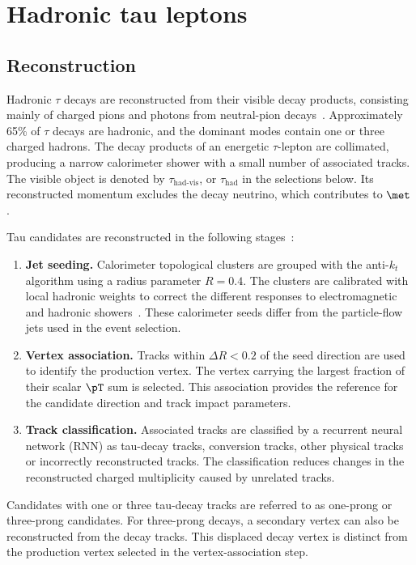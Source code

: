 \section{Hadronic tau leptons}
\label{sec:ch6_tau}

\subsection{Reconstruction}

Hadronic $\tau$ decays are reconstructed from their visible decay products, consisting mainly of charged pions and photons from neutral-pion decays~\cite{ATLAS2022TauR22}.
Approximately 65\% of $\tau$ decays are hadronic, and the dominant modes contain one or three charged hadrons.
The decay products of an energetic $\tau$-lepton are collimated, producing a narrow calorimeter shower with a small number of associated tracks.
The visible object is denoted by $\tau_{\mathrm{had\text{-}vis}}$, or $\tau_{\mathrm{had}}$ in the selections below.
Its reconstructed momentum excludes the decay neutrino, which contributes to $\met$.

Tau candidates are reconstructed in the following stages~\cite{ATLAS2022TauR22}:
\begin{enumerate}
    \item \textbf{Jet seeding.} Calorimeter topological clusters are grouped with the anti-$k_t$ algorithm using a radius parameter $R=0.4$. The clusters are calibrated with local hadronic weights to correct the different responses to electromagnetic and hadronic showers~\cite{ATLAS2017TopoClusters}. These calorimeter seeds differ from the particle-flow jets used in the event selection.
    \item \textbf{Vertex association.} Tracks within $\Delta R<0.2$ of the seed direction are used to identify the production vertex. The vertex carrying the largest fraction of their scalar $\pT$ sum is selected. This association provides the reference for the candidate direction and track impact parameters.
    \item \textbf{Track classification.} Associated tracks are classified by a recurrent neural network (RNN) as tau-decay tracks, conversion tracks, other physical tracks or incorrectly reconstructed tracks. The classification reduces changes in the reconstructed charged multiplicity caused by unrelated tracks.
\end{enumerate}
Candidates with one or three tau-decay tracks are referred to as one-prong or three-prong candidates.
For three-prong decays, a secondary vertex can also be reconstructed from the decay tracks.
This displaced decay vertex is distinct from the production vertex selected in the vertex-association step.

